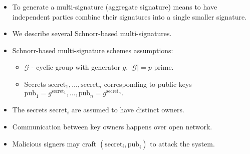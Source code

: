 \begin{frame}
\begin{itemize}
\item To generate a multi-signature (aggregate signature) means to have independent parties combine their signatures into a single smaller signature.
\item We describe several Schnorr-based multi-signatures. 
\item Schnorr-based multi-signature schemes assumptions:
\begin{emptyTheorem}
\begin{itemize}
\item $\mathcal G$ - cyclic group with generator $g$, $\left|\mathcal G\right| = p$ prime.
\item Secrets $\mathrm{secret}_1, \dots, \mathrm{secret}_n $ corresponding to public keys $\mathrm{pub}_1 = g^{\mathrm{secret}_1}, \dots, \mathrm{pub}_n = g^{\mathrm{secret}_n}.$
\end{itemize}
\end{emptyTheorem}
\item The secrets $\mathrm{secret}_i$ are assumed to have distinct owners. 
\item Communication between key owners happens over open network. 
\item Malicious signers may craft $\left(\mathrm{secret}_i, \mathrm{pub}_i\right)$ to attack the system.
\end{itemize}

\end{frame}